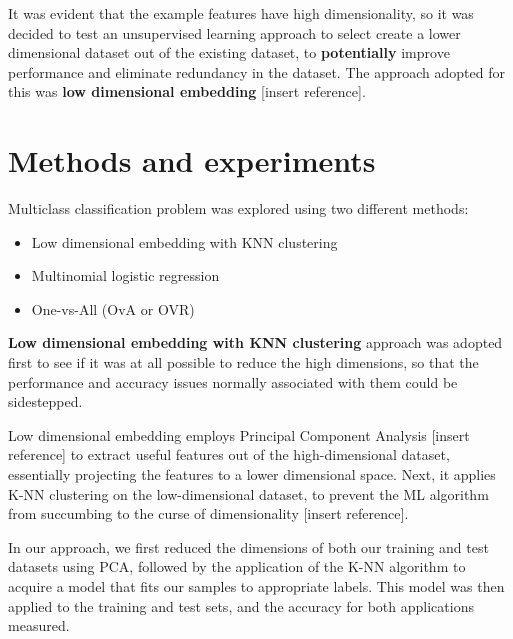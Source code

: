 \documentclass[journal]{IEEEtran}
\begin{document}
It was evident that the example features have high dimensionality, so it was decided to test an unsupervised learning approach to select create a lower dimensional dataset out of the existing dataset, to \textbf{potentially} improve performance and eliminate redundancy in the dataset. The approach adopted for this was \textbf{low dimensional embedding} [insert reference]. \par

\section{Methods and experiments}
Multiclass classification problem was explored using two different methods: \par
\begin{itemize}
	\item Low dimensional embedding with KNN clustering
	\item Multinomial logistic regression
	\item One-vs-All (OvA or OVR)
\end{itemize}
\textbf{Low dimensional embedding with KNN clustering} approach was adopted first to see if it was at all possible to reduce the high dimensions, so that the performance and accuracy issues normally associated with them could be sidestepped.\par

Low dimensional embedding employs Principal Component Analysis [insert reference] to extract useful features out of the high-dimensional dataset, essentially projecting the features to a lower dimensional space. Next, it applies K-NN clustering on the low-dimensional dataset, to prevent the ML algorithm from succumbing to the curse of dimensionality [insert reference]. \par

In our approach, we first reduced the dimensions of both our training and test datasets using PCA, followed by the application of the K-NN algorithm to acquire a model that fits our samples to appropriate labels. This model was then applied to the training and test sets, and the accuracy for both applications measured. \par
\end{document}

